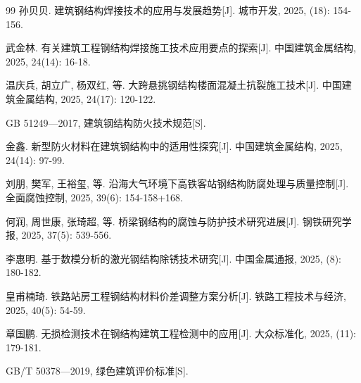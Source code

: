 ﻿\documentclass[UTF8,a4paper,10.5pt]{ctexart}
\begin{document}
\begin{thebibliography}{99}
孙贝贝. 建筑钢结构焊接技术的应用与发展趋势[J]. 城市开发, 2025, (18): 154-156.

武金林. 有关建筑工程钢结构焊接施工技术应用要点的探索[J]. 中国建筑金属结构, 2025, 24(14): 16-18.

温庆兵, 胡立广, 杨双红, 等. 大跨悬挑钢结构楼面混凝土抗裂施工技术[J]. 中国建筑金属结构, 2025, 24(17): 120-122.

GB 51249—2017, 建筑钢结构防火技术规范[S].

金鑫. 新型防火材料在建筑钢结构中的适用性探究[J]. 中国建筑金属结构, 2025, 24(14): 97-99.

刘朋, 樊军, 王裕玺, 等. 沿海大气环境下高铁客站钢结构防腐处理与质量控制[J]. 全面腐蚀控制, 2025, 39(6): 154-158+168.

何润, 周世康, 张琦超, 等. 桥梁钢结构的腐蚀与防护技术研究进展[J]. 钢铁研究学报, 2025, 37(5): 539-556.

李惠明. 基于数模分析的激光钢结构除锈技术研究[J]. 中国金属通报, 2025, (8): 180-182.

皇甫楠琦. 铁路站房工程钢结构材料价差调整方案分析[J]. 铁路工程技术与经济, 2025, 40(5): 54-59.

章国鹏. 无损检测技术在钢结构建筑工程检测中的应用[J]. 大众标准化, 2025, (11): 179-181.

GB/T 50378—2019, 绿色建筑评价标准[S].

\end{thebibliography}
\end{document}

